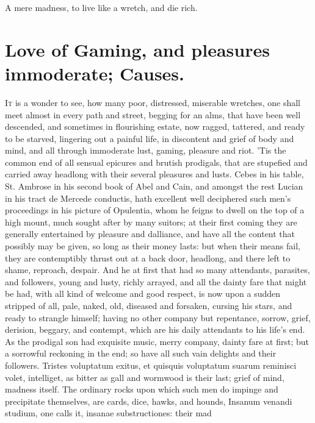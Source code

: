 {A mere madness, to live like a wretch, and die rich.

\section[Love of Gaming]{Love of Gaming, \etc{} and pleasures immoderate; Causes.}

\lettrine{I}{t} is a wonder to see, how many poor, distressed, miserable wretches,
one shall meet almost in every path and street, begging for an alms,
that have been well descended, and sometimes in flourishing estate, now
ragged, tattered, and ready to be starved, lingering out a painful
life, in discontent and grief of body and mind, and all through
immoderate lust, gaming, pleasure and riot. 'Tis the common end of all
sensual epicures and brutish prodigals, that are stupefied and carried
away headlong with their several pleasures and lusts. Cebes in his
table, St. Ambrose in his second book of Abel and Cain, and amongst the
rest Lucian in his tract de Mercede conductis, hath excellent well
deciphered such men's proceedings in his picture of Opulentia, whom he
feigns to dwell on the top of a high mount, much sought after by many
suitors; at their first coming they are generally entertained by
pleasure and dalliance, and have all the content that possibly may be
given, so long as their money lasts: but when their means fail, they
are contemptibly thrust out at a back door, headlong, and there left to
shame, reproach, despair. And he at first that had so many attendants,
parasites, and followers, young and lusty, richly arrayed, and all the
dainty fare that might be had, with all kind of welcome and good
respect, is now upon a sudden stripped of all, pale, naked, old,
diseased and forsaken, cursing his stars, and ready to strangle
himself; having no other company but repentance, sorrow, grief,
derision, beggary, and contempt, which are his daily attendants to his
life's end. As the prodigal son had exquisite music, merry
company, dainty fare at first; but a sorrowful reckoning in the end; so
have all such vain delights and their followers. Tristes
voluptatum exitus, et quisquis voluptatum suarum reminisci volet,
intelliget, as bitter as gall and wormwood is their last; grief of
mind, madness itself. The ordinary rocks upon which such men do impinge
and precipitate themselves, are cards, dice, hawks, and hounds, Insanum
venandi studium, one calls it, insanae substructiones: their mad
}

